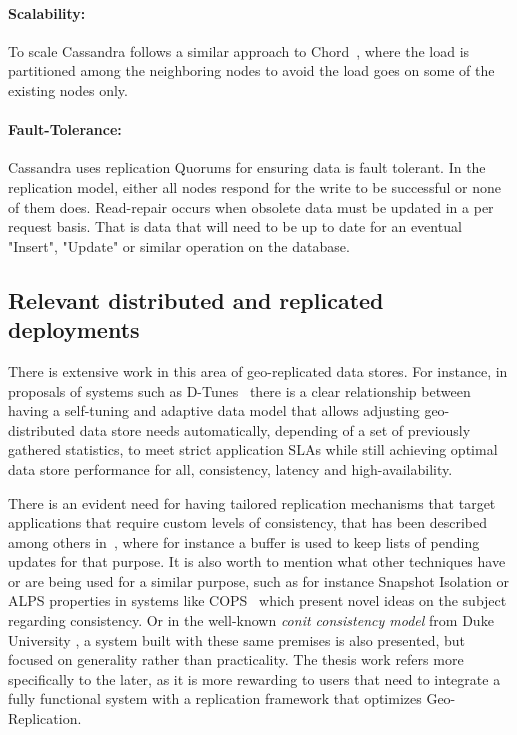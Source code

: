 \paragraph*{Scalability:}
To scale Cassandra follows a similar approach to Chord~\cite{Stoica:2001}, where the load is partitioned among the neighboring nodes to avoid the load goes on some of the existing nodes only.

\paragraph*{Fault-Tolerance:}
Cassandra uses replication Quorums for ensuring data is fault tolerant. In the replication model, either all nodes respond for the write to be successful or none of them does. Read-repair occurs when obsolete data must be updated in a per request basis. That is data that will need to be up to date for an eventual "Insert", "Update" or similar operation on the database.

%


\subsection{Relevant distributed and replicated deployments}\label{distributed-architecture}
There is extensive work in this area of geo-replicated data stores. For instance, in proposals of systems such as D-Tunes~\cite{PN:2013} there is a clear relationship between having a self-tuning and adaptive data model that allows adjusting geo-distributed data store needs automatically, depending of a set of previously gathered statistics, to meet strict application SLAs while still achieving optimal data store performance for all, consistency, latency and high-availability.

There is an evident need for having tailored replication mechanisms that target applications that require custom levels of consistency, that has been described among others in~\cite{Kraska:2009}, where for instance a buffer is used to keep lists of pending updates for that purpose. It is also worth to mention what other techniques have or are being used for a similar purpose, such as for instance Snapshot Isolation or ALPS properties in systems like COPS~\cite{Lloyd:2011} which present novel ideas on the subject regarding consistency. Or in the well-known \emph{conit consistency model} from Duke University \cite{Duke:2001}, a system built with these same premises is also presented, but focused on generality rather than practicality. The thesis work refers more specifically to the later, as it is more rewarding to users that need to integrate a fully functional system with a replication framework that optimizes Geo-Replication.

